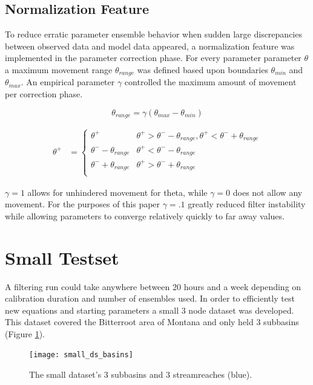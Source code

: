 \subsection{Normalization Feature}

To reduce erratic parameter ensemble behavior when sudden large discrepancies between observed data and model data appeared, a normalization feature was implemented in the parameter correction phase. For every parameter parameter $\theta$ a maximum movement range $\theta_{range}$ was defined based upon boundaries $\theta_{min}$ and $\theta_{max}$. An empirical parameter $\gamma$ controlled the maximum amount of movement per correction phase. 

\begin{equation}\label{eq:max_movement_thetarange}
\theta_{range} = \gamma(\theta_{max} - \theta_{min})
\end{equation}

\begin{align}\label{eq:max_movement}
\theta^{+} &= \left\{
\begin{array}{ll}
\theta^{+} & \theta^{+} > \theta^{-} - \theta_{range}, \theta^{+} < \theta^{-} + \theta_{range}  \\
\theta^{-} - \theta_{range} & \theta^{+} < \theta^{-} - \theta_{range} \\
\theta^{-} + \theta_{range} & \theta^{+} > \theta^{-} + \theta_{range} \\
\end{array}
\right.
\end{align}


$\gamma = 1$ allows for unhindered movement for theta, while $\gamma = 0$ does not allow any movement. For the purposes of this paper $\gamma = .1$ greatly reduced filter instability while allowing parameters to converge relatively quickly to far away values.

\section{Small Testset}

A filtering run could take anywhere between 20 hours and a week depending on calibration duration and number of ensembles used. In order to efficiently test new equations and starting parameters a small 3 node dataset was developed. This dataset covered the Bitterroot area of Montana and only held 3 subbasins (Figure \ref{fig:small_ds_basins}).

\begin{figure}[h]
    \centering
    \texttt{[image: small\_ds\_basins]}
    \caption{The small dataset's 3 subbasins and 3 streamreaches (blue).}
    \label{fig:small_ds_basins}
\end{figure}